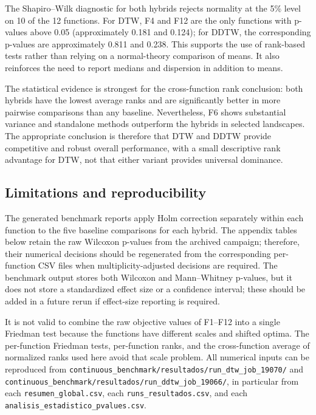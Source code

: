 The Shapiro--Wilk diagnostic for both hybrids rejects normality at the 5\%
level on 10 of the 12 functions. For DTW, F4 and F12 are the only functions
with p-values above 0.05 (approximately 0.181 and 0.124); for DDTW, the
corresponding p-values are approximately 0.811 and 0.238. This supports the use of
rank-based tests rather than relying on a normal-theory comparison of means.
It also reinforces the need to report medians and dispersion in addition to
means.

The statistical evidence is strongest for the cross-function rank conclusion:
both hybrids have the lowest average ranks and are significantly better in more
pairwise comparisons than any baseline. Nevertheless, F6 shows substantial
variance and standalone methods outperform the hybrids in selected landscapes.
The appropriate conclusion is therefore that DTW and DDTW provide competitive
and robust overall performance, with a small descriptive rank advantage for
DTW, not that either variant provides universal dominance.

\subsection{Limitations and reproducibility}

The generated benchmark reports apply Holm correction separately within each
function to the five baseline comparisons for each hybrid. The appendix tables
below retain the raw Wilcoxon p-values from the archived campaign; therefore,
their numerical decisions should be regenerated from the corresponding
per-function CSV files when multiplicity-adjusted decisions are required. The
benchmark output stores both Wilcoxon and
Mann--Whitney p-values, but it does not store a standardized effect size or a
confidence interval; these should be added in a future rerun if effect-size
reporting is required.

It is not valid to combine the raw objective values of F1--F12 into a single
Friedman test because the functions have different scales and shifted
optima. The per-function Friedman tests, per-function ranks, and the
cross-function average of normalized ranks used here avoid that scale
problem. All numerical inputs can be reproduced from
\texttt{continuous\_benchmark/resultados/run\_dtw\_job\_19070/} and
\texttt{continuous\_benchmark/resultados/run\_ddtw\_job\_19066/}, in
particular from each \texttt{resumen\_global.csv}, each
\texttt{runs\_resultados.csv}, and each
\texttt{analisis\_estadistico\_pvalues.csv}.
